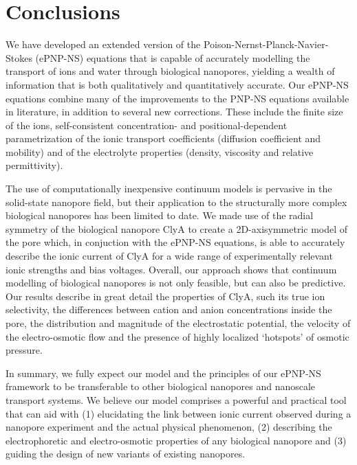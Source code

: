 \documentclass[journal=ancac3,manuscript=article,etalmode=truncate,maxauthors=0,layout=onecolumn]{achemso}
\begin{document}
\section{Conclusions}\label{sec:conclusions}

We have developed an extended version of the Poison-Nernst-Planck-Navier-Stokes (ePNP-NS) equations that is
capable of accurately modelling the transport of ions and water through biological nanopores, yielding a
wealth of information that is both qualitatively and quantitatively accurate. Our ePNP-NS equations combine
many of the improvements to the PNP-NS equations available in literature, in addition to several new
corrections. These include the finite size of the ions, self-consistent concentration- and
positional-dependent parametrization of the ionic transport coefficients (diffusion coefficient and mobility)
and of the electrolyte properties (density, viscosity and relative permittivity).

The use of computationally inexpensive continuum models is pervasive in the solid-state nanopore field, but
their application to the structurally more complex biological nanopores has been limited to date. We made use
of the radial symmetry of the biological nanopore ClyA to create a 2D-axisymmetric model of the pore which, in
conjuction with the ePNP-NS equations, is able to accurately describe the ionic current of ClyA for a wide
range of experimentally relevant ionic strengths and bias voltages. Overall, our approach shows that continuum
modelling of biological nanopores is not only feasible, but can also be predictive. Our results describe in
great detail the properties of ClyA, such its true ion selectivity, the differences between cation and anion
concentrations inside the pore, the distribution and magnitude of the electrostatic potential, the velocity of
the electro-osmotic flow and the presence of highly localized `hotspots' of osmotic pressure. 

In summary, we fully expect our model and the principles of our ePNP-NS framework to be transferable to other
biological nanopores and nanoscale transport systems. We believe our model comprises a powerful and practical
tool that can aid with (1) elucidating the link between ionic current observed during a nanopore experiment
and the actual physical phenomenon, (2) describing the electrophoretic and electro-osmotic properties of any
biological nanopore and (3) guiding the design of new variants of existing nanopores. 

\end{document}
